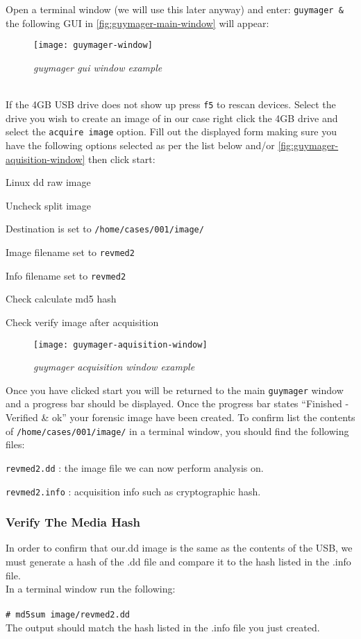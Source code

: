 \documentclass[a4paper,11pt]{article}
\begin{document}
Open a terminal window (we will use this later anyway) and enter: \texttt{{guymager {\&}}} the following GUI in \autoref{fig:guymager-main-window} will appear:
\begin{figure}[h]
	\centering
	\texttt{[image: guymager-window]}
	\caption{\textit{guymager gui window example}}
	\label{fig:guymager-main-window}
\end{figure}
\\
If the 4GB USB drive does not show up press \texttt{f5} to rescan devices.  Select the drive you wish to create an image of in our case right click the 4GB drive and select the \texttt{acquire image} option. Fill out the displayed form making sure you have the following options selected as per the list below and/or \autoref{fig:guymager-aquisition-window} then click start:
\begin{itemize*}
\item Linux dd raw image
\item Uncheck split image
\item Destination is set to \texttt{/home/cases/001/image/}
\item Image filename set to \texttt{revmed2}
\item Info filename set to \texttt{revmed2}
\item Check calculate md5 hash
\item Check verify image after acquisition
\end{itemize*}
\begin{figure}[h]
	\centering
	\texttt{[image: guymager-aquisition-window]}
	\caption{\textit{guymager acquisition window example}}
	\label{fig:guymager-aquisition-window}
\end{figure}

\newpage
Once you have clicked start you will be returned to the main \texttt{guymager} window and a progress bar should be displayed. Once the progress bar states ``Finished - Verified {\&} ok'' your forensic image have been created. To confirm list the contents of \texttt{/home/cases/001/image/} in a terminal window, you should find the following files: 
\begin{itemize*}
\item \texttt{revmed2.dd} : the image file we can now perform analysis on.
\item \texttt{revmed2.info} : acquisition info such as cryptographic hash.
\end{itemize*}

\subsubsection*{Verify The Media Hash}
In order to confirm that our.dd image is the same as the contents of the USB, we must generate a hash of the .dd file and compare it to the hash listed in the .info file.
\\
In a terminal window run the following:\\ \\
\texttt{{\#} md5sum image/revmed2.dd}\\
The output should match the hash listed in the .info file you just created.\\
\end{document}
